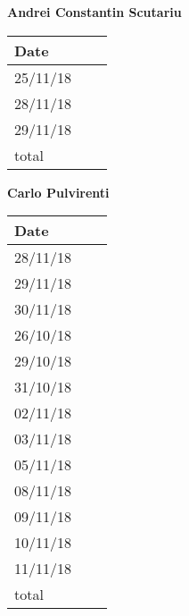 \documentclass[../main.tex]{subfiles}
\begin{document}
\begin{center}
{\bf Andrei Constantin Scutariu}
	\vspace{2mm}

		\begin{tabular}{p{1.3cm}|p{1.8cm}|p{6.7cm}}
			\hline
			\bf Date & \bf \makebox[1.8cm][c]{Hours} & \bf \makebox[6.7cm][c]{Description} \\
			\hline
			25/11/18 & \makebox[1.8cm][c]{0.5h} & \makebox[6.7cm][c]{Initial Structure}\\
			28/11/18 & \makebox[1.8cm][c]{0.5h} & \makebox[6.7cm][c]{Introduction}\\
			29/11/18 & \makebox[1.8cm][c]{2h} & \makebox[6.7cm][c]{Component view}\\
			total    & \makebox[1.8cm][c]{3h}
		\end{tabular}
\end{center}
\vspace{1cm}

\begin{center}
	{\bf Carlo Pulvirenti}
	\vspace{2mm}

		\begin{tabular}{p{1.3cm}|p{1.8cm}|p{6.7cm}}
			\hline
			\bf Date & \bf \makebox[1.8cm][c]{Hours} & \bf \makebox[6.7cm][c]{Description} \\
			\hline
			28/11/18 & \makebox[1.8cm][c]{1h} & \makebox[6.7cm][c]{Runtime View}\\
			29/11/18 & \makebox[1.8cm][c]{3h} & \makebox[6.7cm][c]{Runtime View}\\
			30/11/18 & \makebox[1.8cm][c]{2h} & \makebox[6.7cm][c]{Runtime View}\\
			26/10/18 & \makebox[1.8cm][c]{2h} & \makebox[6.7cm][c]{Purpose, Scope}\\
			29/10/18 & \makebox[1.8cm][c]{6h} & \makebox[6.7cm][c]{Use Cases}\\
			31/10/18 & \makebox[1.8cm][c]{6h} & \makebox[6.7cm][c]{Use Cases, Scenarios}\\
			02/11/18 & \makebox[1.8cm][c]{4h} & \makebox[6.7cm][c]{Scenarios}\\
			03/11/18 & \makebox[1.8cm][c]{1h} & \makebox[6.7cm][c]{UML Class \& State Machine Diagrams}\\
			05/11/18 & \makebox[1.8cm][c]{4h} & \makebox[6.7cm][c]{Scenarios, Sequence Diagrams}\\
			08/11/18 & \makebox[1.8cm][c]{2h} & \makebox[6.7cm][c]{Sequence Diagramm, Alloy}\\
			09/11/18 & \makebox[1.8cm][c]{2h} & \makebox[6.7cm][c]{Sequence Diagram, Revisioning}\\
			10/11/18 & \makebox[1.8cm][c]{2h} & \makebox[6.7cm][c]{Revisioning}\\
			11/11/18 & \makebox[1.8cm][c]{4h} & \makebox[6.7cm][c]{Revisioning}\\
			total    & \makebox[1.8cm][c]{42h}
		\end{tabular}
\end{center}
\end{document}
